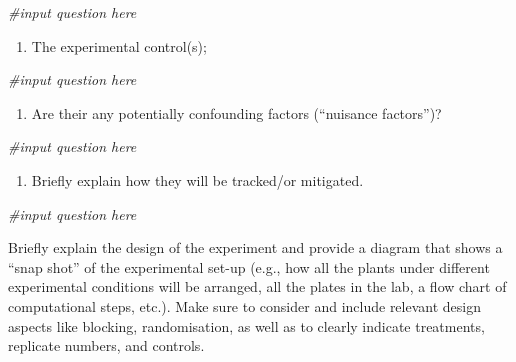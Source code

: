 \documentclass[
]{book}
\newenvironment{Shaded}{\begin{snugshade}}{\end{snugshade}}
\newcommand{\CommentTok}[1]{\textcolor[rgb]{0.56,0.35,0.01}{\textit{#1}}}
\providecommand{\tightlist}{%
  \setlength{\itemsep}{0pt}\setlength{\parskip}{0pt}}
\begin{document}
\begin{Shaded}
\begin{Highlighting}[]
\CommentTok{\#input question here}
\end{Highlighting}
\end{Shaded}

\begin{enumerate}
\def\labelenumi{\arabic{enumi})}
\setcounter{enumi}{4}
\tightlist
\item
  The experimental control(s);
\end{enumerate}

\begin{Shaded}
\begin{Highlighting}[]
\CommentTok{\#input question here}
\end{Highlighting}
\end{Shaded}

\begin{enumerate}
\def\labelenumi{\arabic{enumi})}
\setcounter{enumi}{5}
\tightlist
\item
  Are their any potentially confounding factors (``nuisance factors'')?
\end{enumerate}

\begin{Shaded}
\begin{Highlighting}[]
\CommentTok{\#input question here}
\end{Highlighting}
\end{Shaded}

\begin{enumerate}
\def\labelenumi{\arabic{enumi})}
\setcounter{enumi}{6}
\tightlist
\item
  Briefly explain how they will be tracked/or mitigated.
\end{enumerate}

\begin{Shaded}
\begin{Highlighting}[]
\CommentTok{\#input question here}
\end{Highlighting}
\end{Shaded}

Briefly explain the design of the experiment and provide a diagram that shows a ``snap shot'' of the experimental set-up (e.g., how all the plants under different experimental conditions will be arranged, all the plates in the lab, a flow chart of computational steps, etc.). Make sure to consider and include relevant design aspects like blocking, randomisation, as well as to clearly indicate treatments, replicate numbers, and controls.
\end{document}

